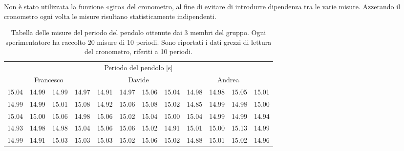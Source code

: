 Non è stato utilizzata la funzione «giro» del cronometro, al fine di evitare
di introdurre dipendenza tra le varie misure. Azzerando il cronometro ogni 
volta le misure risultano statisticamente indipendenti.

\begin{table}[bt]
	\begin{tabular} {c c c c | c c c c | c c c c}
		\toprule
		\multicolumn{12}{c}{Periodo del pendolo [s]} \\
		\multicolumn{4}{c}{Francesco} & \multicolumn{4}{c}{Davide} & \multicolumn{4}{c}{Andrea} \\
		\midrule
		15.04 & 14.99 & 14.99 & 14.97 & 14.91 & 14.97 & 15.06 & 15.04 & 14.98 & 14.98 & 15.05 & 15.01 \\
		14.99 & 14.99 & 15.01 & 15.08 & 14.92 & 15.06 & 15.08 & 15.02 & 14.85 & 14.99 & 14.98 & 15.00 \\
		15.04 & 15.00 & 15.06 & 14.98 & 15.06 & 15.02 & 15.04 & 15.00 & 15.04 & 14.99 & 14.99 & 14.94 \\
		14.93 & 14.98 & 14.98 & 15.04 & 15.06 & 15.06 & 15.02 & 14.91 & 15.01 & 15.00 & 15.13 & 14.99 \\
		14.99 & 14.91 & 15.03 & 15.03 & 15.03 & 15.02 & 15.06 & 15.02 & 14.88 & 15.01 & 15.02 & 14.96 \\
		\bottomrule
	\end{tabular}

	\caption{Tabella delle misure del periodo del pendolo ottenute dai 3 membri del gruppo.
        Ogni sperimentatore ha raccolto 20 misure di 10 periodi. Sono riportati
        i dati grezzi di lettura del cronometro, riferiti a 10 periodi. }
    \label{tab:pendolo}
\end{table}

